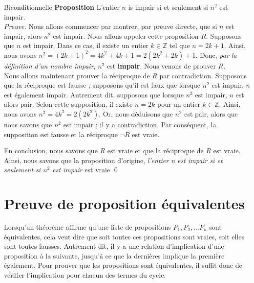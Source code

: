 \documentclass[16pt]{report}
\begin{document}
\begin{multicols*}{2}
        \begin{Preuve}{Biconditionnelle}{}
           \textbf{Proposition} \quad L'entier $n$ is impair si et seulement si $n^2$ est impair. 
           \vspace{1em}\\ 
           \textit{Preuve.} Nous allons commencer par montrer, par preuve directe, que si $n$ est impair, 
           alors $n^2$ est impair. Nous allons appeler cette proposition $R$. Supposons que 
           $n$ est impair. Dans ce cas, il existe un entier $k \in \mathbb{Z}$ tel que $n = 2k + 1$. 
           Ainsi, nous avons $n^2 = (2k + 1)^2 = 4k^2 + 4k + 1 = 2(2k^2 + 2k) + 1$. 
           Donc, \textit{par la définition d'un nombre impair}, $n^2$ est \textbf{impair}. Nous 
           venons de prouver $R$. 
           \vspace{1em}\\
           Nous allons maintenant prouver la réciproque de $R$ par contradiction. Supposons
           que la réciproque est fausse ; supposons qu'il est faux 
           que lorsque $n^2$ est impair, $n$ est également impair. Autrement dit, supposons que lorsque 
           $n^2$ est impair, $n$ est alors pair. Selon cette supposition, il existe $n = 2k$ pour un entier 
           $k \in \mathbb{Z}$. Ainsi, nous avons $n^2 = 4k^2 = 2(2k^2)$. Or, nous déduisons que $n^2$ est pair, 
           alors que nous savons que $n^2$ est impair ; il y a contradiction. Par conséquent, la supposition est 
           fausse et la réciproque $\neg R$ est vraie.
        
           En conclusion, nous savons que $R$ est vraie et que la réciproque de $R$ est vraie. Ainsi, 
           nous savons que la proposition d'origine, 
           \textit{l'entier n est impair si et seulement si $n^2$ est impair} est vraie \qed  
        \end{Preuve}                            




        \section{Preuve de proposition équivalentes}
        
    
        Lorsqu'un théorème affirme qu'une liste de propositions $P_1, P_2, \dots P_n$ sont équivalentes, cela veut 
        dire que soit toutes ces propositions sont vraies, soit elles sont toutes fausses. Autrement dit, il y a une 
        relation d'implication d'une proposition à la suivante, jusqu'à ce que la dernières implique la première 
        également. Pour prouver que les propositions sont équivalentes, il suffit donc de vérifier l'implication 
        pour chacun des termes du cycle. 
       

\end{multicols*}
\end{document}
